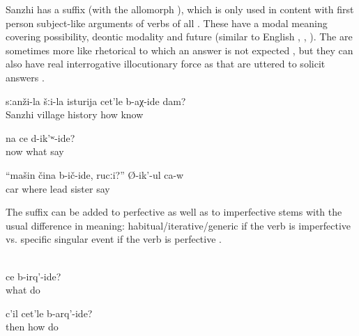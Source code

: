 Sanzhi has a suffix  (with the allomorph ), which is only used in content  with first person subject-like arguments of verbs of all . These  have a modal meaning covering possibility, deontic modality and future (similar to English , , ). The  are sometimes more like rhetorical  to which an answer is not expected , but they can also have real interrogative illocutionary force as  that are uttered to solicit answers . 
%
\begin{exe}
	\ex	\label{ex:‎How can I know about the history of Sanzhi}
	\gll	sːanži-la	šːi-la	isturija	cet'le	b-aχ-ide	dam?\\
		Sanzhi	village	history	how	know 	\\
	\glt	{}

	\ex	\label{ex:‎‎Now what can we say}
	\gll	na	ce	d-ik'ʷ-ide?\\
		now	what	say\\
	\glt	{}

	\ex	\label{ex:‎Where should I bring the car, sister}
	\gll	``mašin	čina	b-ič-ide,	rucːi?''		Ø-ik'-ul	ca-w\\
		car	where		lead		sister		say	\\
	\glt	{}
\end{exe}

The suffix can be added to perfective as well as to imperfective stems with the usual difference in meaning: habitual/iterative/generic if the verb is imperfective  vs. specific singular event if the verb is perfective .
%
\begin{exe}
	\ex	{} \label{ex:What shouldcan we do} \\
	\gll	ce	b-irq'-ide?\\
		what	do\\
	\glt	{}

	\ex	\label{ex:‎Then how should I make (the plough)}
	\gll	c'il	cet'le	b-arq'-ide?\\
		then	how	do\\
	\glt	{}
\end{exe}

